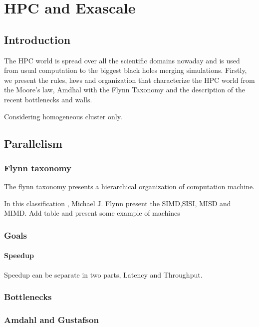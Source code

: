 \chapter{HPC and Exascale}


\section{Introduction}

The HPC world is spread over all the scientific domains nowaday and is used from usual computation to the biggest black holes merging simulations. 
Firstly, we present the rules, laws and organization that characterize the HPC world from the Moore's law, Amdhal with the Flynn Taxonomy and the description of the recent bottlenecks and walls. 

Considering homogeneous cluster only. 

\section{Parallelism}



\subsection{Flynn taxonomy}

The flynn taxonomy presents a hierarchical organization of computation machine.

In this classification \cite{flynn1972some}, Michael J. Flynn present the SIMD,SISI, MISD and MIMD.
Add table and present some example of machines

\subsection{Goals}

\subsubsection{Speedup}

Speedup can be separate in two parts, Latency and Throughput.

\subsection{Bottlenecks}

\subsection{Amdahl and Gustafson}

